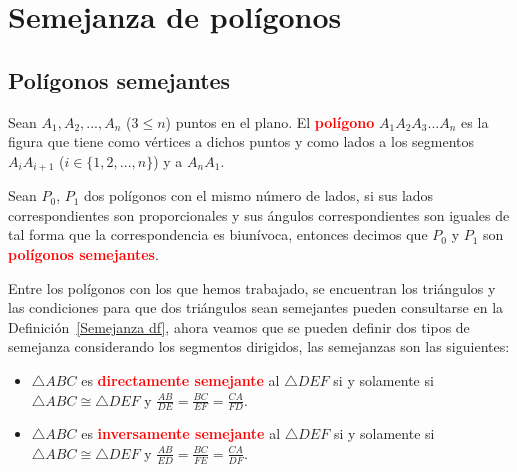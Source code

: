 
\chapter{Semejanza de polígonos}

\section{Polígonos semejantes}

\begin{df} Sean $A_{1},A_{2},...,A_{n}$ ($3\leq n$) puntos en el plano. El \textcolor{red}{\bf polígono} $A_{1}A_{2}A_{3}...A_{n}$ es la figura que tiene como vértices a dichos puntos y como lados a los segmentos $A_{i}A_{i+1}$ ($i\in \{1,2,...,n\}$) y a $A_{n}A_{1}$.
\end{df}
\begin{df}
Sean $P_{0}$, $P_{1}$ dos polígonos con el mismo número de lados, si sus lados correspondientes son proporcionales y sus ángulos correspondientes son iguales de tal forma que la correspondencia es biunívoca, entonces decimos que $P_{0}$ y $P_{1}$ son \textcolor{red}{\bf polígonos semejantes}.
\end{df}

Entre los polígonos con los que hemos trabajado, se encuentran los triángulos y las condiciones para que dos triángulos sean semejantes pueden consultarse en la Definición~\ref{Semejanza df}, ahora veamos que se pueden definir dos tipos de semejanza considerando los segmentos dirigidos, las semejanzas son las siguientes:
\begin{itemize}
\item $\triangle ABC$ es \textcolor{red}{\bf directamente semejante} al $\triangle DEF$ si y solamente si $\triangle ABC\cong\triangle DEF$ y $\frac{AB}{DE}=\frac{BC}{EF}=\frac{CA}{FD}$.
\item $\triangle ABC$ es \textcolor{red}{\bf inversamente semejante} al $\triangle DEF$ si y solamente si $\triangle ABC\cong\triangle DEF$ y $\frac{AB}{ED}=\frac{BC}{FE}=\frac{CA}{DF}$.
\end{itemize}

